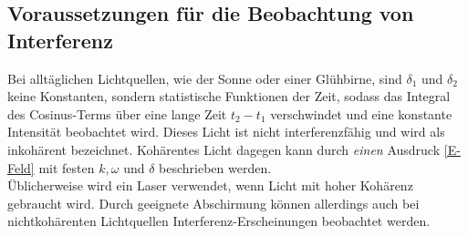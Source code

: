 \subsection*{Voraussetzungen für die Beobachtung von Interferenz}
Bei alltäglichen Lichtquellen, wie der Sonne oder einer Glühbirne, sind $\delta_1$ und $\delta_2$ keine Konstanten, sondern statistische Funktionen der Zeit, sodass das Integral des Cosinus-Terms über eine lange Zeit $t_2-t_1$ verschwindet und eine konstante Intensität beobachtet wird. Dieses Licht ist nicht interferenzfähig und wird als inkohärent bezeichnet. Kohärentes Licht dagegen kann durch \emph{einen} Ausdruck \ref{E-Feld} mit festen $k, \omega$ und $\delta$ beschrieben werden. \\
Üblicherweise wird ein Laser verwendet, wenn Licht mit hoher Kohärenz gebraucht wird. Durch geeignete Abschirmung können allerdings auch bei nichtkohärenten Lichtquellen Interferenz-Erscheinungen beobachtet werden.